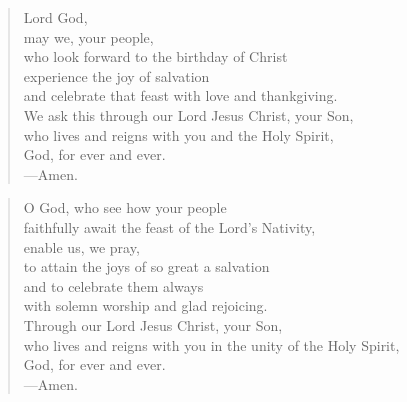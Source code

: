 \prayer

\setlength{\vleftmargin}{\prayerleftmargini}

\begin{verse}
Lord God,\\
may we, your people,\\
who look forward to the birthday of Christ\\
experience the joy of salvation\\
and celebrate that feast with love and thankgiving.\\
We ask this through our Lord Jesus Christ, your Son,\\
who lives and reigns with you and the Holy Spirit,\\
God, for ever and ever.\\
{\color{red}---\thinspace}Amen.
\end{verse}


\begin{verse}
O God, who see how your people\\
faithfully await the feast of the Lord’s Nativity,\\
enable us, we pray,\\
to attain the joys of so great a salvation\\
and to celebrate them always\\
with solemn worship and glad rejoicing.\\
Through our Lord Jesus Christ, your Son,\\
 who lives and reigns with you in the unity of the Holy Spirit,\\
God, for ever and ever.\\
{\color{red}---\thinspace}Amen.
\end{verse}

\setlength{\vleftmargin}{\defleftmargini}